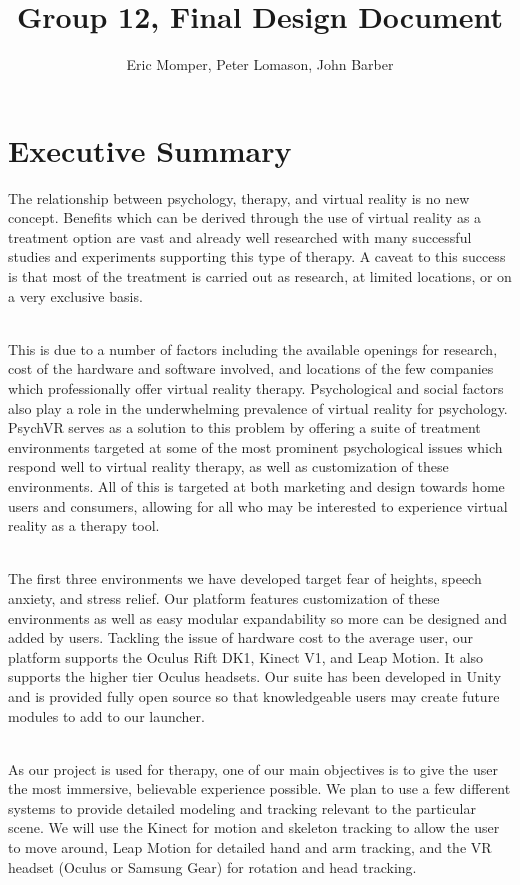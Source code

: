 \documentclass[a4paper,10pt]{article}
\title{Group 12, Final Design Document}
\author{Eric Momper, Peter Lomason, John Barber}
\begin{document}
	
\maketitle
	
	\pagebreak
	\tableofcontents
	\pagebreak
{}	
\section{Executive Summary}
The relationship between psychology, therapy, and virtual reality is no new concept. Benefits which can be derived through the use of virtual reality as a treatment option are vast 
and already well researched with many successful studies and experiments supporting this type of therapy. A caveat to this success is that most of the treatment is carried out as research, 
at limited locations, or on a very exclusive basis.
\par~\\ 
This is due to a number of factors including the available openings for research, cost of the hardware and software involved, and locations of the few companies which professionally offer virtual reality therapy. Psychological and social factors also play a role in the underwhelming prevalence of virtual reality for psychology.  PsychVR serves as a solution to this problem by offering a suite of treatment environments targeted at some of the most prominent psychological issues which respond well to virtual reality therapy, as well as customization of these environments.  All of this is targeted at both marketing and design towards home users and consumers, allowing for all who may be interested to experience virtual reality as a therapy tool.
\par ~\\
The first three environments we have developed target fear of heights, speech anxiety, and stress relief. Our platform features customization of these environments as well as easy modular expandability so more can be designed and added by users.  Tackling the issue of hardware cost to the average user, our platform supports the Oculus Rift DK1, Kinect V1, and Leap Motion. It also supports the higher tier Oculus headsets. Our suite has been developed in Unity and is provided fully open source so that knowledgeable users may create future modules to add to our launcher.
\par ~\\
As our project is used for therapy, one of our main objectives is to give the user the most immersive, believable experience possible. We plan to use a few different systems to provide detailed modeling and tracking relevant to the particular scene. We will use the Kinect for motion and skeleton tracking to allow the user to move around, Leap Motion for detailed hand and arm tracking, and the VR headset (Oculus or Samsung Gear) for rotation and head tracking. 
\end{document}
